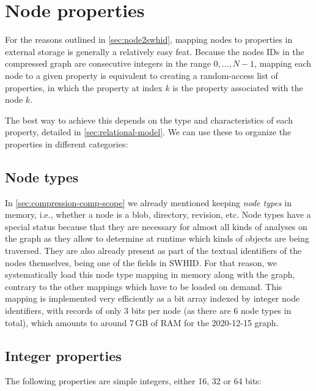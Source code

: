 \section{Node properties}%
\label{sec:node-properties}

For the reasons outlined in \cref{sec:node2swhid}, mapping nodes to properties
in external storage is generally a relatively easy feat. Because the nodes IDs
in the compressed graph are consecutive integers in the range ${0,\ldots,N-1}$,
mapping each node to a given property is equivalent to creating a random-access
list of properties, in which the property at index $k$ is the property
associated with the node $k$.

The best way to achieve this depends on the type and characteristics of each
property, detailed in \cref{sec:relational-model}. We can use these to organize
the properties in different categories:

\subsection{Node types}%
\label{sec:mapping-types}

In \cref{sec:compression-comp-scope} we already mentioned keeping \emph{node
types} in memory, i.e., whether a node is a blob, directory, revision, etc.
Node types have a special status because that they are necessary for almost all
kinds of analyses on the graph as they allow to determine at runtime which
kinds of objects are being traversed. They are also
already present as part of the textual identifiers of the nodes themselves,
being one of the fields in \gls{SWHID}. For that reason, we systematically
load this node type mapping in memory along with the graph, contrary to the
other mappings which have to be loaded on demand.
This mapping is implemented very efficiently as a bit array indexed by integer
node identifiers, with records of only 3 bits per node (as there are 6 node
types in total), which amounts to around 7\,GB of RAM for the 2020-12-15 graph.

\subsection{Integer properties}%
\label{sec:mapping-integers}

The following properties are simple integers, either 16, 32 or 64 bits:

